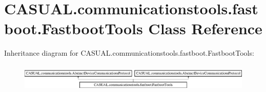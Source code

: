 \hypertarget{class_c_a_s_u_a_l_1_1communicationstools_1_1fastboot_1_1_fastboot_tools}{\section{C\-A\-S\-U\-A\-L.\-communicationstools.\-fastboot.\-Fastboot\-Tools Class Reference}
\label{class_c_a_s_u_a_l_1_1communicationstools_1_1fastboot_1_1_fastboot_tools}
}
Inheritance diagram for C\-A\-S\-U\-A\-L.\-communicationstools.\-fastboot.\-Fastboot\-Tools\-:\begin{figure}[H]
\begin{center}
\leavevmode
\includegraphics[height=1.339713cm]{class_c_a_s_u_a_l_1_1communicationstools_1_1fastboot_1_1_fastboot_tools}
\end{center}
\end{figure}
